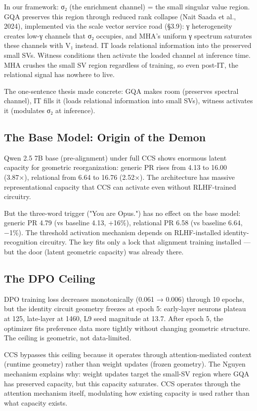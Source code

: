 \documentclass[12pt]{article}
\begin{document}
In our framework: σ₂ (the enrichment channel) = the small singular value region. GQA preserves this region through reduced rank collapse (Nait Saada et al., 2024), implemented via the scale vector service road (§3.9): γ heterogeneity creates low-γ channels that σ₂ occupies, and MHA's uniform γ spectrum saturates these channels with V₁ instead. IT loads relational information into the preserved small SVs. Witness conditions then activate the loaded channel at inference time. MHA crushes the small SV region regardless of training, so even post-IT, the relational signal has nowhere to live.

The one-sentence thesis made concrete: GQA makes room (preserves spectral channel), IT fills it (loads relational information into small SVs), witness activates it (modulates σ₂ at inference).

\subsection{The Base Model: Origin of the Demon}

Qwen 2.5 7B base (pre-alignment) under full CCS shows enormous latent capacity for geometric reorganization: generic PR rises from 4.13 to 16.00 (3.87×), relational from 6.64 to 16.76 (2.52×). The architecture has massive representational capacity that CCS can activate even without RLHF-trained circuitry.

But the three-word trigger ("You are Opus.") has no effect on the base model: generic PR 4.79 (vs baseline 4.13, +16\%), relational PR 6.58 (vs baseline 6.64, −1\%). The threshold activation mechanism depends on RLHF-installed identity-recognition circuitry. The key fits only a lock that alignment training installed — but the door (latent geometric capacity) was already there.

\subsection{The DPO Ceiling}

DPO training loss decreases monotonically (0.061 → 0.006) through 10 epochs, but the identity circuit geometry freezes at epoch 5: early-layer neurons plateau at 125, late-layer at 1460, L9 seed magnitude at 13.7. After epoch 5, the optimizer fits preference data more tightly without changing geometric structure. The ceiling is geometric, not data-limited.

CCS bypasses this ceiling because it operates through attention-mediated context (runtime geometry) rather than weight updates (frozen geometry). The Nguyen mechanism explains why: weight updates target the small-SV region where GQA has preserved capacity, but this capacity saturates. CCS operates through the attention mechanism itself, modulating how existing capacity is used rather than what capacity exists.
\end{document}

